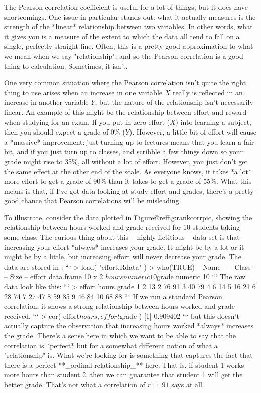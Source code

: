 The Pearson correlation coefficient is useful for a lot of things, but it does have shortcomings. One issue in particular stands out: what it actually measures is the strength of the *linear* relationship between two variables. In other words, what it gives you is a measure of the extent to which the data all tend to fall on a single, perfectly straight line. Often, this is a pretty good approximation to what we mean when we say "relationship", and so the Pearson correlation is a good thing to calculation. Sometimes, it isn't. 

One very common situation where the Pearson correlation isn't quite the right thing to use arises when an increase in one variable $X$ really is reflected in an increase in another variable $Y$, but the nature of the relationship isn't necessarily linear. An example of this might be the relationship between effort and reward when studying for an exam. If you put in zero effort ($X$) into learning a subject, then you should expect a grade of 0\% ($Y$). However, a little bit of effort will cause a *massive* improvement: just turning up to lectures means that you learn a fair bit, and if you just turn up to classes, and scribble a few things down so your grade might rise to 35\%, all without a lot of effort. However, you just don't get the same effect at the other end of the scale. As everyone knows, it takes *a lot* more effort to get a grade of 90\% than it takes to get a grade of 55\%. What this means is that, if I've got data looking at study effort and grades, there's a pretty good chance that Pearson correlations will be misleading. 


To illustrate, consider the data plotted in Figure@reffig:rankcorrpic, showing the relationship between hours worked and grade received for 10 students taking some class. The curious thing about this -- highly fictitious -- data set is that increasing your effort *always* increases your grade. It might be by a lot or it might be by a little, but increasing effort will never decrease your grade. The data are stored in :
```
> load( "effort.Rdata" )
> who(TRUE)
   -- Name --   -- Class --   -- Size --
   effort       data.frame    10 x 2    
    $hours      numeric       10        
    $grade      numeric       10        
```
The raw data look like this:
```
> effort
   hours grade
1      2    13
2     76    91
3     40    79
4      6    14
5     16    21
6     28    74
7     27    47
8     59    85
9     46    84
10    68    88
```
If we run a standard Pearson correlation, it shows a strong relationship between hours worked and grade received,
```
> cor( effort$hours, effort$grade )
[1] 0.909402
```
but this doesn't actually capture the observation that increasing hours worked *always* increases the grade. There's a sense here in which we want to be able to say that the correlation is *perfect* but for a somewhat different notion of what a "relationship" is. What we're looking for is something that captures the fact that there is a perfect **_ordinal relationship_** here. That is, if student 1 works more hours than student 2, then we can guarantee that student 1 will get the better grade. That's not what a correlation of $r = .91$ says at all.

